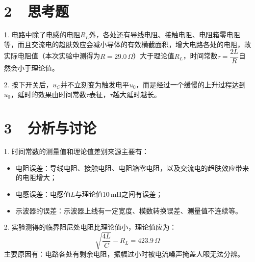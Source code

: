 \documentclass[a4paper,fontset=windows]{ctexart}
\begin{document}
\section*{2\ \ 思考题}

1. 电路中除了电感的电阻$R_L$外，各处还有导线电阻、接触电阻、电阻箱零电阻等，而且交流电的趋肤效应会减小导体的有效横截面积，增大电路各处的电阻，故实际电阻值（本次实验中测得为$R=29.0\,\Omega$）大于理论值$R_L$，时间常数$\tau=\dfrac{2L}{R}$自然会小于理论值。

2. 按下开关后，$u_C$并不立刻变为触发电平$u_0$，而是经过一个缓慢的上升过程达到$u_0$，延时的效果由时间常数$\tau$表征，$\tau$越大延时越长。

\section*{3\ \ 分析与讨论}

1. 时间常数的测量值和理论值差别来源主要有：
\begin{itemize}
    \item 电阻误差：导线电阻、接触电阻、电阻箱零电阻，以及交流电的趋肤效应带来的电阻增大；
    \item 电感误差：电感值$L$与理论值$10\,\mathrm{mH}$之间有误差；
    \item 示波器的误差：示波器上线有一定宽度、模数转换误差、测量值不连续等。
\end{itemize}


2. 实验测得的临界阻尼处电阻比理论值小，理论值应为：
\[
\sqrt{\frac{4L}{C}} - R_L = 423.9\,\Omega
\]
主要原因有：电路各处有剩余电阻，振幅过小时被电流噪声掩盖人眼无法分辨。
\end{document}
